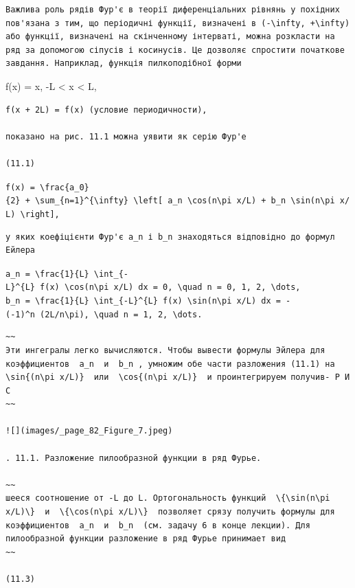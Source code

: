 \documentclass[
  ukrainian,
]{article}
\begin{document}
\begin{verbatim}
Важлива роль рядів Фур'є в теорії диференціальних рівнянь у похідних пов'язана з тим, що періодичні функції, визначені в (-\infty, +\infty) або функції, визначені на скінченному інтерваті, можна розкласти на ряд за допомогою сіпусів і косинусів. Це дозволяє спростити початкове завдання. Наприклад, функція пилкоподібної форми
\end{verbatim}

f(x) = x, -L \textless{} x \textless{} L,

\begin{verbatim}
f(x + 2L) = f(x) (условие периодичности),

показано на рис. 11.1 можна уявити як серію Фур'е

(11.1)
\end{verbatim}

\texttt{f(x)\ =\ \textbackslash{}frac\{a\_0\}\{2\}\ +\ \textbackslash{}sum\_\{n=1\}\^{}\{\textbackslash{}infty\}\ \textbackslash{}left{[}\ a\_n\ \textbackslash{}cos(n\textbackslash{}pi\ x/L)\ +\ b\_n\ \textbackslash{}sin(n\textbackslash{}pi\ x/L)\ \textbackslash{}right{]},}

\begin{verbatim}
у яких коефіцієнти Фур'є a_n і b_n знаходяться відповідно до формул Ейлера
\end{verbatim}

\texttt{a\_n\ =\ \textbackslash{}frac\{1\}\{L\}\ \textbackslash{}int\_\{-L\}\^{}\{L\}\ f(x)\ \textbackslash{}cos(n\textbackslash{}pi\ x/L)\ dx\ =\ 0,\ \textbackslash{}quad\ n\ =\ 0,\ 1,\ 2,\ \textbackslash{}dots,}
\texttt{b\_n\ =\ \textbackslash{}frac\{1\}\{L\}\ \textbackslash{}int\_\{-L\}\^{}\{L\}\ f(x)\ \textbackslash{}sin(n\textbackslash{}pi\ x/L)\ dx\ =\ -(-1)\^{}n\ (2L/n\textbackslash{}pi),\ \textbackslash{}quad\ n\ =\ 1,\ 2,\ \textbackslash{}dots.}

\begin{verbatim}
~~
Эти ингегралы легко вычисляются. Чтобы вывести формулы Эйлера для коэффициентов  a_n  и  b_n , умножим обе части разложения (11.1) на  \sin{(n\pi x/L)}  или  \cos{(n\pi x/L)}  и проинтегрируем получив- Р И С
~~

![](images/_page_82_Figure_7.jpeg)

. 11.1. Разложение пилообразной функции в ряд Фурье.

~~
шееся соотношение от -L до L. Ортогональность функций  \{\sin(n\pi x/L)\}  и  \{\cos(n\pi x/L)\}  позволяет срязу получить формулы для коэффициентов  a_n  и  b_n  (см. задачу 6 в конце лекции). Для пилообразной функции разложение в ряд Фурье принимает вид
~~

(11.3)
\end{verbatim}
\end{document}
